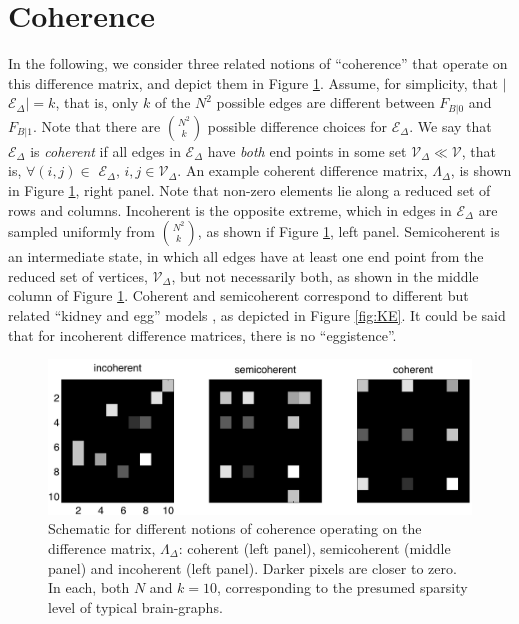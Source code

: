 \documentclass{article}
\newcommand{\mE}{\mathcal{E}}
\newcommand{\mV}{\mathcal{V}}
\newcommand{\Lam}{\Lambda}
\newcommand{\mED}{\mE_{\Delta}}
\begin{document}
\section{Coherence} %
\label{sub:coherence}

In the following, we consider three related notions of ``coherence'' that operate on this difference matrix, and depict them in Figure \ref{fig:coherence}.  Assume, for simplicity, that $|$$\mED$$|=k$, that is, only $k$ of the $N^2$ possible edges are different between $F_{B|0}$ and $F_{B|1}$.  Note that there are $\binom{N^2}{k}$ possible difference choices for $\mED$.  We say that $\mED$ is \emph{coherent} if all edges in $\mED$ have \emph{both} end points in some set $\mV_{\Delta} \ll \mV$, that is, $\forall (i,j)\in$ $\mED$$,\, i,j \in \mV_{\Delta}$.  An example coherent difference matrix, $\Lam_{\Delta}$, is shown in Figure \ref{fig:coherence}, right panel. Note that non-zero elements lie along a reduced set of rows and columns.  Incoherent is the opposite extreme, which in edges in $\mED$ are sampled uniformly from $\binom{N^2}{k}$, as shown if Figure \ref{fig:coherence}, left panel.  Semicoherent is an intermediate state, in which all edges have at least one end point from the reduced set of vertices, $\mV_{\Delta}$, but not necessarily both, as shown in the middle column of Figure \ref{fig:coherence}.  Coherent and semicoherent correspond to different but related ``kidney and egg'' models \cite{??}, as depicted in Figure \ref{fig:KE}.  It could be said that for incoherent difference matrices, there is no ``eggistence''.



\begin{figure}[h!]
\centering \includegraphics[width=.9\linewidth]{coherence}
\caption{Schematic for different notions of coherence operating on the difference matrix, $\Lam_{\Delta}$: coherent (left panel), semicoherent (middle panel) and incoherent (left panel).  Darker pixels are closer to zero.  In each, both $N$ and $k=10$, corresponding to the presumed sparsity level of typical brain-graphs.
}
\label{fig:coherence}
\end{figure}
\end{document}
